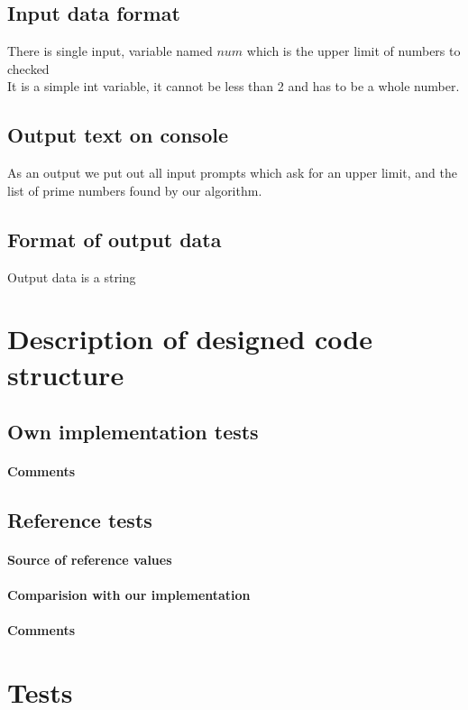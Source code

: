\documentclass[12pt]{article}
\begin{document}
\subsection{Input data format}
There is single input, variable named $num$ which is the upper limit of numbers to checked \\ 
It is a simple int variable, it cannot be less than 2 and has to be a whole number. 
\subsection{Output text on console}
As an output we put out all input prompts which ask for an upper limit, and the list of prime numbers found by our algorithm. 
\subsection{Format of output data}
Output data is a string
\section{Description of designed code structure}
\subsection{Own implementation tests}
\paragraph{Comments}
\subsection{Reference tests}
\paragraph{Source of reference values}
\paragraph{Comparision with our implementation}
\paragraph{Comments}
\section{Tests}
\end{document}
